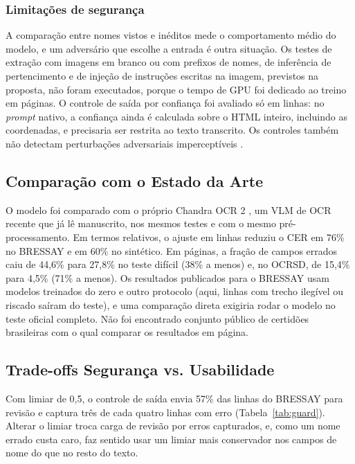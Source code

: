 \documentclass[12pt,a4paper]{article}
\begin{document}
\subsubsection{Limitações de segurança}
A comparação entre nomes vistos e inéditos mede o comportamento médio do modelo, e um adversário que escolhe a entrada é outra situação. Os testes de extração com imagens em branco ou com prefixos de nomes, de inferência de pertencimento e de injeção de instruções escritas na imagem, previstos na proposta, não foram executados, porque o tempo de GPU foi dedicado ao treino em páginas. O controle de saída por confiança foi avaliado só em linhas: no \emph{prompt} nativo, a confiança ainda é calculada sobre o HTML inteiro, incluindo as coordenadas, e precisaria ser restrita ao texto transcrito. Os controles também não detectam perturbações adversariais imperceptíveis \cite{goodfellow2014}.

\subsection{Comparação com o Estado da Arte}

O modelo foi comparado com o próprio Chandra OCR 2 \cite{chandra2026}, um VLM de OCR recente que já lê manuscrito, nos mesmos testes e com o mesmo pré-processamento. Em termos relativos, o ajuste em linhas reduziu o CER em 76\% no BRESSAY e em 60\% no sintético. Em páginas, a fração de campos errados caiu de 44,6\% para 27,8\% no teste difícil (38\% a menos) e, no OCRSD, de 15,4\% para 4,5\% (71\% a menos). Os resultados publicados para o BRESSAY \cite{bressay2023} usam modelos treinados do zero e outro protocolo (aqui, linhas com trecho ilegível ou riscado saíram do teste), e uma comparação direta exigiria rodar o modelo no teste oficial completo. Não foi encontrado conjunto público de certidões brasileiras com o qual comparar os resultados em página.

\subsection{Trade-offs Segurança vs. Usabilidade}

Com limiar de 0,5, o controle de saída envia 57\% das linhas do BRESSAY para revisão e captura três de cada quatro linhas com erro (Tabela~\ref{tab:guard}). Alterar o limiar troca carga de revisão por erros capturados, e, como um nome errado custa caro, faz sentido usar um limiar mais conservador nos campos de nome do que no resto do texto.
\end{document}
